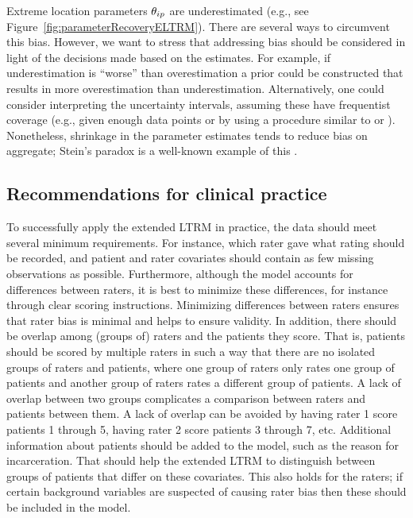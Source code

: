 \documentclass[a4paper,usenames,dvipsnames]{article}
\newenvironment{revision}{\color{teal}}{\color{black}}
\begin{document}
\begin{revision}
Extreme location parameters $\theta_{ip}$ are underestimated (e.g., see Figure~\ref{fig:parameterRecoveryELTRM}). There are several ways to circumvent this bias. However, we want to stress that addressing bias should be considered in light of the decisions made based on the estimates. For example, if underestimation is ``worse'' than overestimation a prior could be constructed that results in more overestimation than underestimation.  Alternatively, one could consider interpreting the uncertainty intervals, assuming these have frequentist coverage (e.g., given enough data points or by using a procedure similar to  or \cite{hoff2019exact}). Nonetheless, shrinkage in the parameter estimates tends to reduce bias on aggregate; Stein’s paradox is a well-known example of this \cite{EfronMorris1977}.
\end{revision}

\subsection*{Recommendations for clinical practice}
To successfully apply the extended LTRM in practice, the data should meet several minimum requirements. 
\begin{revision}%
For instance, which rater gave what rating should be recorded, and patient and rater covariates should contain as few missing observations as possible.
\end{revision}%
\begin{revision}Furthermore, \end{revision}although the model accounts for differences between raters, it is best to minimize these differences, for instance through clear scoring instructions. Minimizing differences between raters ensures that rater bias is minimal and helps to ensure validity. In addition, there should be overlap among (groups of) raters and the patients they score. That is, patients should be scored by multiple raters in such a way that there are no isolated groups of raters and patients, where one group of raters only rates one group of patients and another group of raters rates a different group of patients. A lack of overlap between two groups complicates a comparison between raters and patients between them. A lack of overlap can be avoided by having rater 1 score patients 1 through 5, having rater 2 score patients 3 through 7, etc. Additional information about patients should be added to the model, such as the reason for incarceration. That should help the extended LTRM to distinguish between groups of patients that differ on these covariates. This also holds for the raters; if certain background variables are suspected of causing rater bias then these should be included in the model.
\end{document}
